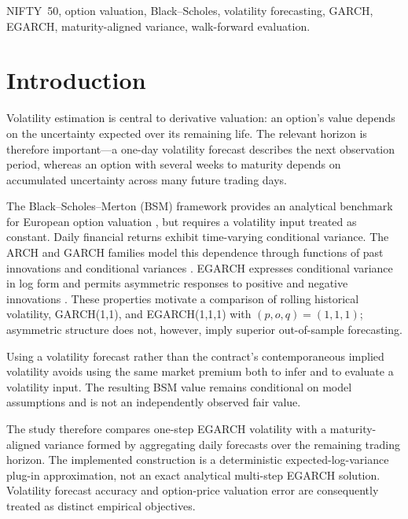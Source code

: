 \documentclass[journal]{IEEEtran}
\begin{document}
\begin{IEEEkeywords}
NIFTY~50, option valuation, Black--Scholes, volatility forecasting, GARCH, EGARCH, maturity-aligned variance, walk-forward evaluation.
\end{IEEEkeywords}

\IEEEpeerreviewmaketitle

\section{Introduction}

Volatility estimation is central to derivative valuation: an option's value depends on the uncertainty expected over its remaining life. The relevant horizon is therefore important—a one-day volatility forecast describes the next observation period, whereas an option with several weeks to maturity depends on accumulated uncertainty across many future trading days.

The Black--Scholes--Merton (BSM) framework provides an analytical benchmark for European option valuation \cite{black1973,merton1973}, but requires a volatility input treated as constant. Daily financial returns exhibit time-varying conditional variance. The ARCH and GARCH families model this dependence through functions of past innovations and conditional variances \cite{engle1982,bollerslev1986}. EGARCH expresses conditional variance in log form and permits asymmetric responses to positive and negative innovations \cite{nelson1991}. These properties motivate a comparison of rolling historical volatility, GARCH(1,1), and EGARCH(1,1,1) with $(p,o,q)=(1,1,1)$; asymmetric structure does not, however, imply superior out-of-sample forecasting.

Using a volatility forecast rather than the contract's contemporaneous implied volatility avoids using the same market premium both to infer and to evaluate a volatility input. The resulting BSM value remains conditional on model assumptions and is not an independently observed fair value.

The study therefore compares one-step EGARCH volatility with a maturity-aligned variance formed by aggregating daily forecasts over the remaining trading horizon. The implemented construction is a deterministic expected-log-variance plug-in approximation, not an exact analytical multi-step EGARCH solution. Volatility forecast accuracy and option-price valuation error are consequently treated as distinct empirical objectives.
\end{document}
